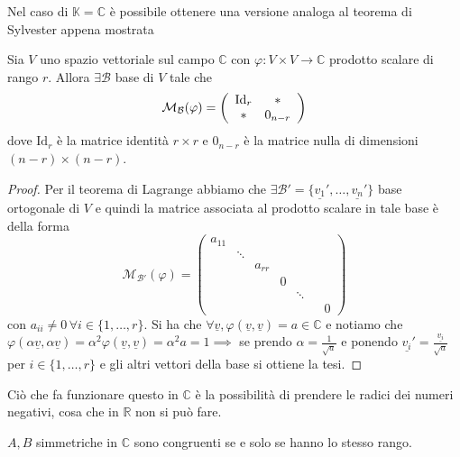 Nel caso di $\mathbb{K} = \mathbb{C}$ è possibile ottenere una versione analoga al teorema di Sylvester appena mostrata
\begin{theorem}
	Sia $V$ uno spazio vettoriale sul campo $\mathbb{C}$ con $\varphi: V \times V \to \mathbb{C}$ prodotto scalare di rango $r$. Allora $\exists \mathcal{B}$ base di $V$ tale che
	\begin{align}
		\mathcal{M}_\mathcal{B}(\varphi) = \left( \begin{array}{c c}
			\text{Id}_r & * \\
			* & 0_{n-r}
		\end{array} \right)
	\end{align}
	dove $\text{Id}_r$ è la matrice identità $r \times r$ e $0_{n-r}$ è la matrice nulla di dimensioni $(n-r) \times (n-r)$.
\end{theorem}
\begin{proof}
	Per il teorema di Lagrange abbiamo che $\exists \mathcal{B}' = \{ \underline{v_1}', \ldots, \underline{v_n}' \}$ base ortogonale di $V$ e quindi la matrice associata al prodotto scalare in tale base è della forma
	$$
		\mathcal{M}_{\mathcal{B}'}(\varphi) = \begin{pmatrix}
			a_{11} & & & & & \\
			& \ddots & & & & \\
			& & a_{rr} & & & \\
			& & & 0 & & \\
			& & & & \ddots & \\
			& & & & & & 0 
		\end{pmatrix}
	$$
	con $a_{ii} \neq 0 \, \forall i \in \{ 1, \ldots, r\}$. Si ha che $\forall \underline{v}, \varphi(\underline{v}, \underline{v}) = a \in \mathbb{C}$ e notiamo che $\varphi(\alpha \underline{v}, \alpha \underline{v}) = \alpha^2 \varphi(\underline{v}, \underline{v}) = \alpha^2 a = 1 \implies$ se prendo $\alpha = \frac{1}{\sqrt{a}}$ e ponendo $\underline{v_i}' = \frac{\underline{v_i}}{\sqrt{a}}$ per $i \in \{ 1, \ldots, r\}$ e gli altri vettori della base si ottiene la tesi.
\end{proof}
\begin{remark}
	Ciò che fa funzionare questo in $\mathbb{C}$ è la possibilità di prendere le radici dei numeri negativi, cosa che in $\mathbb{R}$ non si può fare.  
\end{remark}
\begin{cor}
	$A, B$ simmetriche in $\mathbb{C}$ sono congruenti se e solo se hanno lo stesso rango.
\end{cor}
